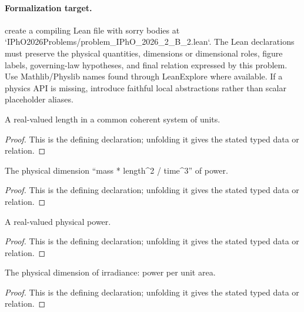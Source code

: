 \paragraph{Formalization target.}
create a compiling Lean file with sorry bodies at `IPhO2026Problems/problem\_IPhO\_2026\_2\_B\_2.lean`. The Lean declarations must preserve the physical quantities, dimensions or dimensional roles, figure labels, governing-law hypotheses, and final relation expressed by this problem.
Use Mathlib/Physlib names found through LeanExplore where available. If a physics API is missing, introduce faithful local abstractions rather than scalar placeholder aliases.

\begin{definition}[LengthQuantity]
  \label{decl:physics:IPhO_2026_2_B_2:LengthQuantity}
  A real-valued length in a common coherent system of units.
\end{definition}
\begin{proof}
  This is the defining declaration; unfolding it gives the stated typed data or relation.
\end{proof}

\begin{definition}[powerDimension]
  \label{decl:physics:IPhO_2026_2_B_2:powerDimension}
  The physical dimension “mass * length\textasciicircum{}2 / time\textasciicircum{}3” of power.
\end{definition}
\begin{proof}
  This is the defining declaration; unfolding it gives the stated typed data or relation.
\end{proof}

\begin{definition}[PowerQuantity]
  \label{decl:physics:IPhO_2026_2_B_2:PowerQuantity}
  A real-valued physical power.
\end{definition}
\begin{proof}
  This is the defining declaration; unfolding it gives the stated typed data or relation.
\end{proof}

\begin{definition}[irradianceDimension]
  \label{decl:physics:IPhO_2026_2_B_2:irradianceDimension}
  The physical dimension of irradiance: power per unit area.
\end{definition}
\begin{proof}
  This is the defining declaration; unfolding it gives the stated typed data or relation.
\end{proof}

